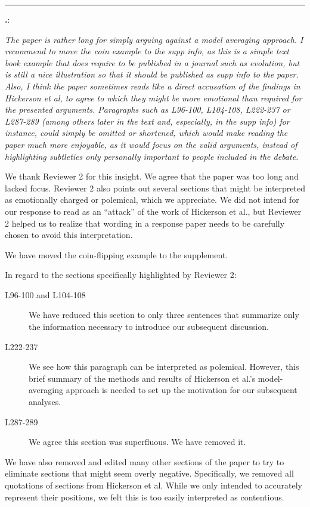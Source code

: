 \documentclass[12pt]{article}
\newcounter{commentCounter}
\newcommand{\revcomment}[1]{{\addtocounter{commentCounter}{1}}
    \medskip \hrule \noindent
\textbf{\arabic{section}.\arabic{commentCounter}}: {\sl #1}\par\xspace}
\newcommand{\response}[1]{{\addtolength{\leftskip}{0.25in} #1\par}\xspace}
\begin{document}
\revcomment{
    The paper is rather long for simply arguing against a model averaging
    approach. I recommend to move the coin example to the supp info, as this is
    a simple text book example that does require to be published in a journal
    such as evolution, but is still a nice illustration so that it should be
    published as supp info to the paper. Also, I think the paper sometimes
    reads like a direct accusation of the findings in Hickerson et al, to agree
    to which they might be more emotional than required for the presented
    arguments. Paragraphs such as L96-100, L104-108, L222-237 or L287-289
    (among others later in the text and, especially, in the supp info) for
    instance, could simply be omitted or shortened, which would make reading
    the paper much more enjoyable, as it would focus on the valid arguments,
    instead of highlighting subtleties only personally important to people
    included in the debate.
    
}
\response{
    We thank Reviewer 2 for this insight. We agree that the paper was too long
    and lacked focus. Reviewer 2 also points out several sections that might be
    interpreted as emotionally charged or polemical, which we appreciate. We
    did not intend for our response to read as an ``attack'' of the work of
    Hickerson et al., but Reviewer 2 helped us to realize that wording in a
    response paper needs to be carefully chosen to avoid this interpretation.

    We have moved the coin-flipping example to the supplement.

    In regard to the sections specifically highlighted by Reviewer 2:
    \begin{description}
        \item[L96-100 and L104-108]
            We have reduced this section to only three sentences that summarize
            only the information necessary to introduce our subsequent
            discussion.
        \item[L222-237]
            We see how this paragraph can be interpreted as polemical. However,
            this brief summary of the methods and results of Hickerson et al.'s
            model-averaging approach is needed to set up the motivation for our
            subsequent analyses.
        \item[L287-289]
            We agree this section was superfluous. We have removed it.
    \end{description}
    
    We have also removed and edited many other sections of the paper to try to
    eliminate sections that might seem overly negative. Specifically, we
    removed all quotations of sections from Hickerson et al. While we only
    intended to accurately represent their positions, we felt this is too
    easily interpreted as contentious.
}
\end{document}
